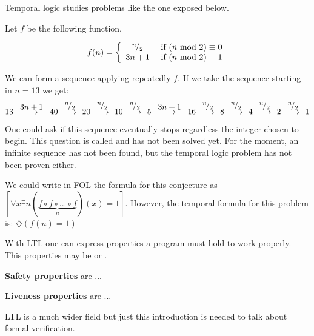 \begin{example}
Temporal logic studies problems like the one exposed below.

\label{Collatz:conjecture}

Let $f$ be the following function.

\[
f(n) = \left\{
	\begin{array}{cc}
		{}^{n}\!/_{2} & \text{ if } (n\text{ mod } 2) \equiv 0\\
		3n+1 & \text{ if } (n\text{ mod } 2) \equiv 1
	\end{array}
\right.
\]

We can form a sequence applying repeatedly $f$. If we take the sequence starting in $n=13$ we get:
%
\[ 
	13 \overset{\displaystyle\;\; 3n+1\;\;}{\longrightarrow}
	40 \overset{\displaystyle\;\;{}^{n}\!/_{2}\;\;}{\longrightarrow}
	20 \overset{\displaystyle\;\;{}^{n}\!/_{2}\;\;}{\longrightarrow}
	10 \overset{\displaystyle\;\;{}^{n}\!/_{2}\;\;}{\longrightarrow}
	5 \overset{\displaystyle\;\; 3n+1\;\;}{\longrightarrow}
	16 \overset{\displaystyle\;\;{}^{n}\!/_{2}\;\;}{\longrightarrow}
	8 \overset{\displaystyle\;\;{}^{n}\!/_{2}\;\;}{\longrightarrow}
	4 \overset{\displaystyle\;\;{}^{n}\!/_{2}\;\;}{\longrightarrow}
	2 \overset{\displaystyle\;\;{}^{n}\!/_{2}\;\;}{\longrightarrow}
	1
\]
%
One could ask if this sequence eventually stops regardless the integer chosen to begin. This question is called  and has not been solved yet. 
%
For the moment, an infinite sequence has not been found, but the temporal logic problem has not been proven either.
%

We could write in \gls{FOL} the formula for this conjecture as $[ \forall x \exists n (\underbrace{f \circ f \circ  ... \circ f}_{n})(x) = 1]$. However, the temporal formula for this problem is: $\diamondsuit \left(f(n) = 1\right)$
\end{example}


With \gls{LTL} one can express properties a program must hold to work properly. 
%
This properties may be  or .

\label{def::safety}
\textbf{Safety properties} are ... 

\label{def::liveness}
\textbf{Liveness properties} are ... 


\gls{LTL} is a much wider field but just this introduction is needed to talk about formal verification.

